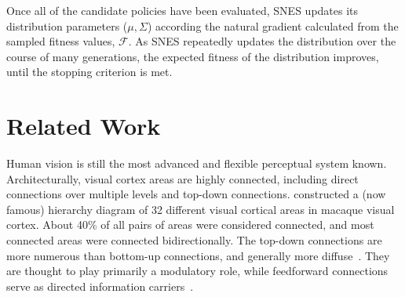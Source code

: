 Once all of the candidate policies have been evaluated, SNES updates
its distribution parameters ($\mu, \Sigma$) according the natural
gradient calculated from the sampled fitness values, $\mathcal{F}$.
As SNES repeatedly updates the distribution over the course of many
generations, the expected fitness of the distribution improves, until
the stopping criterion is met.




\section{Related Work}
Human vision is still the most advanced and flexible perceptual system
known.  Architecturally, visual cortex areas are highly connected,
including direct connections over multiple levels and top-down
connections. \citet{felleman1991distributed} constructed a (now
famous) hierarchy diagram of 32 different visual cortical areas in
macaque visual cortex.  About 40\% of all pairs of areas were
considered connected, and most connected areas were connected 
bidirectionally.  The top-down connections are more numerous than
bottom-up connections, and generally more
diffuse~\cite{douglas1995recurrent}.  They are thought to play 
primarily a modulatory role, while feedforward connections serve as
directed information carriers~\cite{Bullier2004}.

